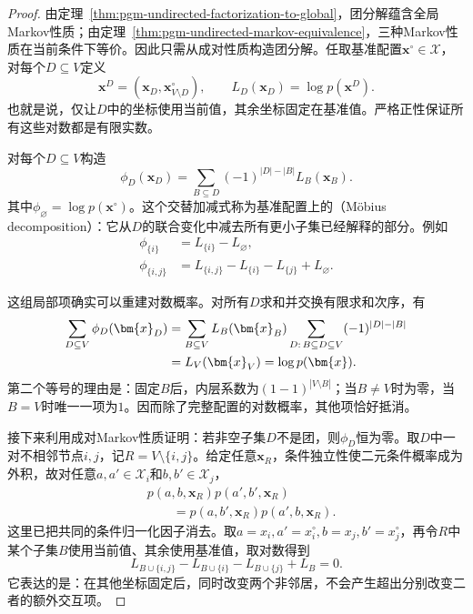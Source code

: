 \begin{proof}
由定理~\ref{thm:pgm-undirected-factorization-to-global}，团分解蕴含全局Markov性质；由定理~\ref{thm:pgm-undirected-markov-equivalence}，三种Markov性质在当前条件下等价。因此只需从成对性质构造团分解。任取基准配置$\bm{x}^{\circ}\in\mathcal{X}$，对每个$D\subseteq V$定义
\[
  \bm{x}^{D}=(\bm{x}_D,\bm{x}^{\circ}_{V\setminus D}),
  \qquad
  L_D(\bm{x}_D)=\log p(\bm{x}^{D}).
\]
也就是说，仅让$D$中的坐标使用当前值，其余坐标固定在基准值。严格正性保证所有这些对数都是有限实数。

对每个$D\subseteq V$构造
\begin{equation}
  \phi_D(\bm{x}_D)
  =\sum_{B\subseteq D}(-1)^{|D|-|B|}L_B(\bm{x}_B).
  \label{eq:pgm-undirected-mobius}
\end{equation}
其中$\phi_{\varnothing}=\log p(\bm{x}^{\circ})$。这个交替加减式称为基准配置上的（Möbius decomposition）：它从$D$的联合变化中减去所有更小子集已经解释的部分。例如
\[
  \begin{aligned}
    \phi_{\{i\}}&=L_{\{i\}}-L_{\varnothing},\\
    \phi_{\{i,j\}}
      &=L_{\{i,j\}}-L_{\{i\}}-L_{\{j\}}+L_{\varnothing}.
  \end{aligned}
\]

这组局部项确实可以重建对数概率。对所有$D$求和并交换有限求和次序，有
\begin{align}
  \sum_{D\subseteq V}\phi_D(\bm{x}_D)
  &=\sum_{B\subseteq V}L_B(\bm{x}_B)
      \sum_{D:\,B\subseteq D\subseteq V}(-1)^{|D|-|B|}
      \notag\\
  &=L_V(\bm{x}_V)=\log p(\bm{x}).
  \label{eq:pgm-undirected-mobius-inversion}
\end{align}
第二个等号的理由是：固定$B$后，内层系数为$(1-1)^{|V\setminus B|}$；当$B\neq V$时为零，当$B=V$时唯一一项为$1$。因而除了完整配置的对数概率，其他项恰好抵消。

接下来利用成对Markov性质证明：若非空子集$D$不是团，则$\phi_D$恒为零。取$D$中一对不相邻节点$i,j$，记$R=V\setminus\{i,j\}$。给定任意$\bm{x}_R$，条件独立性使二元条件概率成为外积，故对任意$a,a'\in\mathcal{X}_i$和$b,b'\in\mathcal{X}_j$，
\begin{equation}
  \begin{aligned}
    &p(a,b,\bm{x}_R)p(a',b',\bm{x}_R)\\
    &\qquad=p(a,b',\bm{x}_R)p(a',b,\bm{x}_R).
  \end{aligned}
  \label{eq:pgm-undirected-rectangle}
\end{equation}
这里已把共同的条件归一化因子消去。取$a=x_i,a'=x_i^{\circ},b=x_j,b'=x_j^{\circ}$，再令$R$中某个子集$B$使用当前值、其余使用基准值，取对数得到
\[
  L_{B\cup\{i,j\}}-L_{B\cup\{i\}}
  -L_{B\cup\{j\}}+L_B=0.
\]
它表达的是：在其他坐标固定后，同时改变两个非邻居，不会产生超出分别改变二者的额外交互项。


\end{proof}
